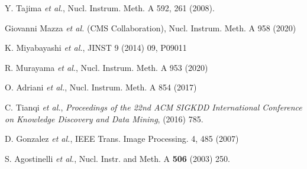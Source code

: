 \documentclass[preprint,12pt,times,a4paper]{elsarticle}
\begin{document}
\begin{thebibliography}{99}
 
Y. Tajima {\it et al.}, Nucl. Instrum. Meth. A 592, 261 (2008).

Giovanni Mazza {\it et al.} (CMS Collaboration), Nucl. Instrum. Meth. A 958 (2020)

K. Miyabayashi {\it et al.}, JINST 9 (2014) 09, P09011

R. Murayama {\it et al.}, Nucl. Instrum. Meth. A 953 (2020) 
 
O. Adriani {\it et al.}, Nucl. Instrum. Meth. A 854 (2017) 

C. Tianqi {\it et al.}, 
{\it Proceedings of the 22nd ACM SIGKDD International Conference on Knowledge Discovery and Data Mining},
(2016) 785.

D. Gonzalez {\it et al.}, IEEE Trans. Image Processing. 4, 485 (2007)

S. Agostinelli {\it et al.},  Nucl. Instr. and Meth. A {\bf 506} (2003) 250.

\end{thebibliography}


%
%

\end{document}
